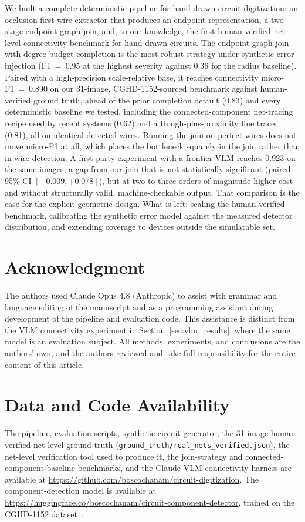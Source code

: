 \documentclass[journal]{IEEEtran}
\begin{document}
We built a complete deterministic pipeline for hand-drawn circuit digitization: an occlusion-first wire extractor that produces an endpoint representation, a two-stage endpoint-graph join, and, to our knowledge, the first human-verified net-level connectivity benchmark for hand-drawn circuits. The endpoint-graph join with degree-budget completion is the most robust strategy under synthetic error injection (F1~=~0.95 at the highest severity against 0.36 for the radius baseline). Paired with a high-precision scale-relative base, it reaches connectivity micro-F1~=~0.890 on our 31-image, CGHD-1152-sourced benchmark against human-verified ground truth, ahead of the prior completion default (0.83) and every deterministic baseline we tested, including the connected-component net-tracing recipe used by recent systems (0.62) and a Hough-plus-proximity line tracer (0.81), all on identical detected wires. Running the join on perfect wires does not move micro-F1 at all, which places the bottleneck squarely in the join rather than in wire detection. A first-party experiment with a frontier VLM reaches 0.923 on the same images, a gap from our join that is not statistically significant (paired 95\% CI $[-0.009, +0.078]$), but at two to three orders of magnitude higher cost and without structurally valid, machine-checkable output. That comparison is the case for the explicit geometric design. What is left: scaling the human-verified benchmark, calibrating the synthetic error model against the measured detector distribution, and extending coverage to devices outside the simulatable set.


\section*{Acknowledgment}
The authors used Claude Opus 4.8 (Anthropic) to assist with grammar and language editing of the manuscript and as a programming assistant during development of the pipeline and evaluation code. This assistance is distinct from the VLM connectivity experiment in Section~\ref{sec:vlm_results}, where the same model is an evaluation subject. All methods, experiments, and conclusions are the authors' own, and the authors reviewed and take full responsibility for the entire content of this article.

\section*{Data and Code Availability}
The pipeline, evaluation scripts, synthetic-circuit generator, the 31-image
human-verified net-level ground truth (\texttt{ground\_truth/real\_nets\_verified.json}),
the net-level verification tool used to produce it, the join-strategy and
connected-component baseline benchmarks, and the Claude-VLM connectivity harness are
available at
\url{https://github.com/boscochanam/circuit-digitization}. The component-detection model
is available at \url{https://huggingface.co/boscochanam/circuit-component-detector}, trained
on the CGHD-1152 dataset~\cite{bayer2021cghd}.
\end{document}
